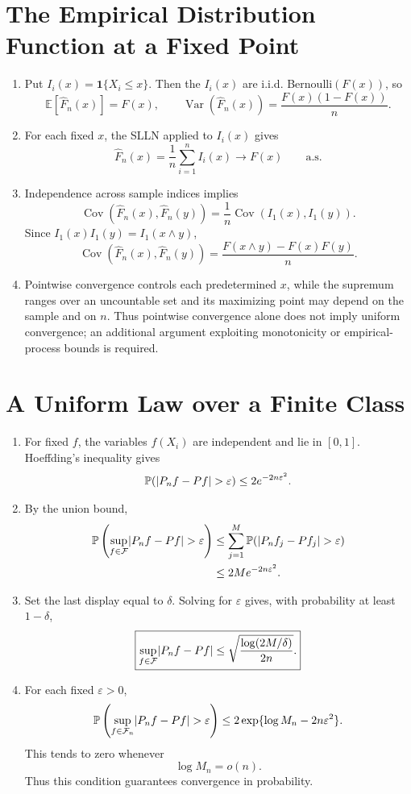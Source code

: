 \documentclass[11pt]{article}
\newcommand{\bbE}{\mathbb{E}}
\newcommand{\bbP}{\mathbb{P}}
\newcommand{\ind}{\mathbf{1}}
\DeclarePairedDelimiter{\abs}{\lvert}{\rvert}
\DeclareMathOperator{\Var}{Var}
\DeclareMathOperator{\Cov}{Cov}
\begin{document}
\section{The Empirical Distribution Function at a Fixed Point}

\begin{enumerate}
\item Put $I_i(x)=\ind\{X_i\leq x\}$. Then the $I_i(x)$ are i.i.d.
Bernoulli$(F(x))$, so
\[
\bbE[\widehat F_n(x)]=F(x),
\qquad
\Var(\widehat F_n(x))
=\frac{F(x)(1-F(x))}{n}.
\]

\item For each fixed $x$, the SLLN applied to $I_i(x)$ gives
\[
\widehat F_n(x)=\frac1n\sum_{i=1}^nI_i(x)\longrightarrow F(x)
\qquad\text{a.s.}
\]

\item Independence across sample indices implies
\[
\Cov(\widehat F_n(x),\widehat F_n(y))
=\frac1n\Cov(I_1(x),I_1(y)).
\]
Since $I_1(x)I_1(y)=I_1(x\wedge y)$,
\[
\boxed{
\Cov(\widehat F_n(x),\widehat F_n(y))
=\frac{F(x\wedge y)-F(x)F(y)}{n}.}
\]

\item Pointwise convergence controls each predetermined $x$, while the
supremum ranges over an uncountable set and its maximizing point may depend
on the sample and on $n$. Thus pointwise convergence alone does not imply
uniform convergence; an additional argument exploiting monotonicity or
empirical-process bounds is required.
\end{enumerate}

\section{A Uniform Law over a Finite Class}

\begin{enumerate}
\item For fixed $f$, the variables $f(X_i)$ are independent and lie in
$[0,1]$. Hoeffding's inequality gives
\[
\bbP(\abs{P_nf-Pf}>\varepsilon)
\leq2e^{-2n\varepsilon^2}.
\]

\item By the union bound,
\[
\begin{aligned}
\bbP\left(\sup_{f\in\mathcal F}\abs{P_nf-Pf}>\varepsilon\right)
&\leq\sum_{j=1}^M
\bbP(\abs{P_nf_j-Pf_j}>\varepsilon)\\
&\leq2Me^{-2n\varepsilon^2}.
\end{aligned}
\]

\item Set the last display equal to $\delta$. Solving for
$\varepsilon$ gives, with probability at least $1-\delta$,
\[
\boxed{
\sup_{f\in\mathcal F}\abs{P_nf-Pf}
\leq\sqrt{\frac{\log(2M/\delta)}{2n}}.}
\]

\item For each fixed $\varepsilon>0$,
\[
\bbP\left(\sup_{f\in\mathcal F_n}\abs{P_nf-Pf}>\varepsilon\right)
\leq2\exp\{\log M_n-2n\varepsilon^2\}.
\]
This tends to zero whenever
\[
\boxed{\log M_n=o(n).}
\]
Thus this condition guarantees convergence in probability.
\end{enumerate}
\end{document}

